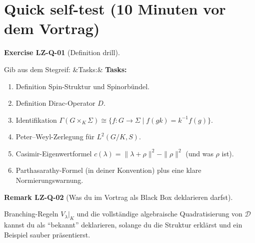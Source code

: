 \documentclass[10pt, letterpaper]{article}
\newenvironment{romanenum}[1][]
  {%
    \ifx&#1&
    \else
      \textbf{#1}\quad
    \fi
    \begin{enumerate}[label=\roman*)]
  }
  {%
    \end{enumerate}%
  }
\newcommand{\CustomHeading}[3]{%
  \par\medskip\noindent%
  \textbf{#1 #2} \textnormal{(#3)}.\enskip%
}
\newenvironment{REM}[2]{\begin{unitbox}\CustomHeading{Remark}{#1}{#2}}{\end{unitbox}}
\newenvironment{EXE}[2]{\begin{unitbox}\CustomHeading{Exercise}{#1}{#2}}{\end{unitbox}}
\begin{document}
\section*{Quick self-test (10 Minuten vor dem Vortrag)}
\begin{EXE}{LZ-Q-01}{Definition drill}
Gib aus dem Stegreif:
\begin{romanenum}[Tasks:]
\item Definition Spin-Struktur und Spinorb\"undel.
\item Definition Dirac-Operator $D$.
\item Identifikation $\Gamma(G\times_K\Sigma)\cong\{f:G\to\Sigma\mid f(gk)=k^{-1}f(g)\}$.
\item Peter--Weyl-Zerlegung f\"ur $L^2(G/K,S)$.
\item Casimir-Eigenwertformel $c(\lambda)=\|\lambda+\rho\|^2-\|\rho\|^2$ (und was $\rho$ ist).
\item Parthasarathy-Formel (in deiner Konvention) plus eine klare Normierungswarnung.
\end{romanenum}
\end{EXE}

\begin{REM}{LZ-Q-02}{Was du im Vortrag als Black Box deklarieren darfst}
Branching-Regeln $V_\lambda|_K$ und die vollst\"andige algebraische Quadratisierung von $\mathcal D$
kannst du als ``bekannt'' deklarieren, solange du die Struktur erkl\"arst und ein Beispiel sauber pr\"asentierst.
\end{REM}



\pagebreak
\printbibliography
\end{document}
